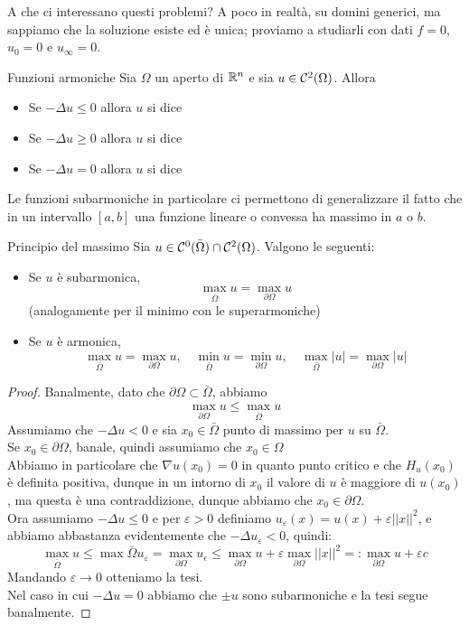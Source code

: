 \documentclass{book}
\begin{document}
A che ci interessano questi problemi? A poco in realtà, su domini generici, ma sappiamo che la soluzione esiste ed è unica; proviamo a studiarli con dati $f= 0$, $u_0 = 0$ e $u_\infty = 0$.

\begin{definition}{Funzioni armoniche}{}
    Sia $\Omega$ un aperto di $\mathbb{R}^n$ e sia $u\in\mathcal{C}^2(\Omega)$. Allora\begin{itemize}
        \item Se $-\Delta u \le 0$ allora $u$ si dice 
        \item Se $-\Delta u \ge 0$ allora $u$ si dice 
        \item Se $-\Delta u = 0$ allora $u$ si dice 
    \end{itemize}
\end{definition}

Le funzioni subarmoniche in particolare ci permettono di generalizzare il fatto che in un intervallo $[a,b]$ una funzione lineare o convessa ha massimo in $a$ o $b$.

\begin{theorem}{Principio del massimo}{}
    Sia $u\in\mathcal{C}^0(\bar{\Omega})\cap\mathcal{C}^2(\Omega)$. Valgono le seguenti:\begin{itemize}
        \item Se $u$ è subarmonica, \[\max_{\bar{\Omega}}u = \max_{\partial\Omega}u\] (analogamente per il minimo con le superarmoniche)
        \item Se $u$ è armonica, \[\max_{\bar{\Omega}} u = \max_{\partial\Omega}u, \quad \min_{\bar{\Omega}} u = \min_{\partial\Omega}u, \quad \max_{\bar{\Omega}}|u| = \max_{\partial\Omega}|u|\]
    \end{itemize}
\end{theorem}

\begin{proof}
    Banalmente, dato che $\partial\Omega\subset\bar{\Omega}$, abbiamo \[\max_{\partial\Omega} u \le \max_{\bar{\Omega}} u\]
    Assumiamo che $-\Delta u < 0$ e sia $x_0\in\bar{\Omega}$ punto di massimo per $u$ su $\bar{\Omega}$.\\
    Se $x_0\in\partial\Omega$, banale, quindi assumiamo che $x_0\in\Omega$\\
    Abbiamo in particolare che $\nabla u (x_0) = 0$ in quanto punto critico e che $H_u(x_0)$ è definita positiva, dunque in un intorno di $x_0$ il valore di $u$ è maggiore di $u(x_0)$, ma questa è una contraddizione, dunque abbiamo che $x_0\in\partial\Omega$.\\
    Ora assumiamo $-\Delta u \le 0$ e per $\varepsilon>0$ definiamo $u_\varepsilon(x) = u(x)+\varepsilon ||x||^2$, e abbiamo abbastanza evidentemente che $-\Delta u_\varepsilon < 0$, quindi:
    \[\max_{\bar{\Omega}}u \le \max{\bar{\Omega}} u_\varepsilon = \max_{\partial\Omega} u_\epsilon \le \max_{\partial\Omega} u + \varepsilon \max_{\partial\Omega}||x||^2 =: \max_{\partial\Omega} u + \varepsilon c \]
    Mandando $\varepsilon\to 0$ otteniamo la tesi.\\
    Nel caso in cui $-\Delta u = 0$ abbiamo che $\pm u$ sono subarmoniche e la tesi segue banalmente.
\end{proof}
\end{document}
